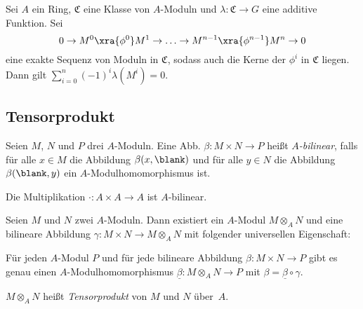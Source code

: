 \documentclass{cheat-sheet}
\newcommand{\SC}{\mathfrak{C}} %
\begin{document}
\begin{prop}
  Sei $A$ ein Ring, $\SC$ eine Klasse von $A$-Moduln und $\lambda : \SC \to G$ eine additive Funktion.
  Sei
  \[
    0 \to M^0 \xra{\phi^0} M^1 \to \ldots \to M^{n-1} \xra{\phi^{n-1}} M^n \to 0
  \]
  eine exakte Sequenz von Moduln in $\SC$, sodass auch die Kerne der $\phi^i$ in $\SC$ liegen.
  Dann gilt
  ${\sum}_{i=0}^n (-1)^i \lambda(M^i) = 0$.
\end{prop}

\subsection{Tensorprodukt}


\begin{defn}
  Seien $M$, $N$ und $P$ drei $A$-Moduln.
  Eine Abb. $\beta : M \times N \to P$ heißt \emph{$A$-bilinear}, falls für alle $x \in M$ die Abbildung $\beta(x, \blank)$ und für alle $y \in N$ die Abbildung $\beta(\blank, y)$ ein $A$-Modulhomomorphismus ist.
\end{defn}

\begin{bsp}
  Die Multiplikation $\cdot : A \times A \to A$ ist $A$-bilinear.
\end{bsp}

\begin{prop}
  Seien $M$ und $N$ zwei $A$-Moduln.
  Dann existiert ein $A$-Modul $M \otimes_A N$ und eine bilineare Abbildung $\gamma : M \times N \to M \otimes_A N$ mit folgender universellen Eigenschaft:

  \hfill\begin{minipage}{0.95 \linewidth}
    Für jeden $A$-Modul $P$ und für jede bilineare Abbildung $\beta : M \times N \to P$ gibt es genau einen $A$-Modulhomomorphismus $\underline{\beta} : M \otimes_A N \to P$ mit $\beta = \underline{\beta} \circ \gamma$.
  \end{minipage}
\end{prop}

\begin{defn}
  $M \otimes_A N$ heißt \emph{Tensorprodukt} von $M$ und $N$ über~$A$.
\end{defn}
\end{document}
